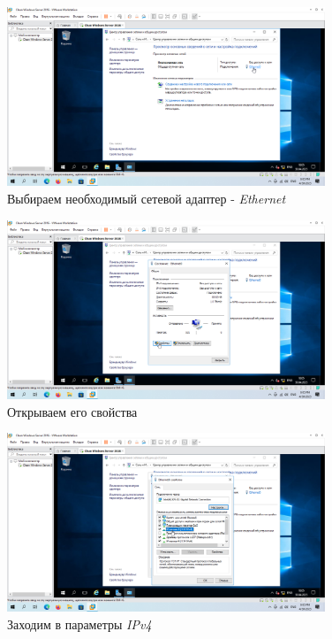 \documentclass[a4paper]{article}
\begin{document}
  \begin{figure}[H]
    \centering
    \includegraphics[width=0.85\textwidth]{Screenshot_22}
    \caption{Выбираем необходимый сетевой адаптер - \textit{Ethernet}}
    \label{img:22}
  \end{figure}

  \begin{figure}[H]
    \centering
    \includegraphics[width=0.85\textwidth]{Screenshot_24}
    \caption{Открываем его свойства}
    \label{img:24}
  \end{figure}

  \begin{figure}[H]
    \centering
    \includegraphics[width=0.85\textwidth]{Screenshot_25}
    \caption{Заходим в параметры \textit{IPv4}}
    \label{img:25}
  \end{figure}
\end{document}
